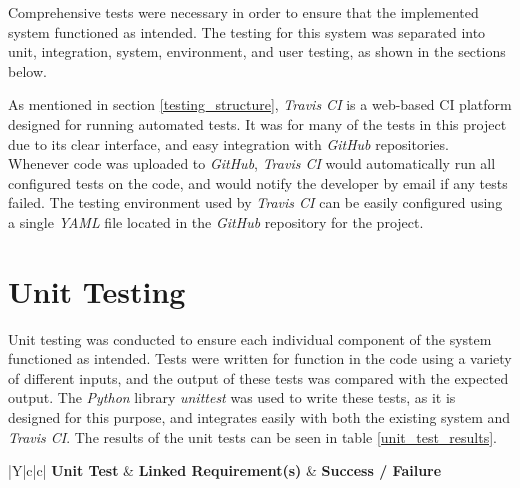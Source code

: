 %
%

Comprehensive tests were necessary in order to ensure that the implemented system functioned as intended.
The testing for this system was separated into unit, integration, system, environment, and user testing, as shown in the sections below.

As mentioned in section \ref{testing_structure}, \textit{Travis CI} \cite{travis_ci} is a web-based CI platform designed for running automated tests.
It was for many of the tests in this project due to its clear interface, and easy integration with \textit{GitHub} repositories.
Whenever code was uploaded to \textit{GitHub}, \textit{Travis CI} would automatically run all configured tests on the code, and would notify the developer by email if any tests failed.
The testing environment used by \textit{Travis CI} can be easily configured using a single \textit{YAML} \cite{yaml} file located in the \textit{GitHub} repository for the project.



\section{Unit Testing}
\label{unit_testing}
Unit testing was conducted to ensure each individual component of the system functioned as intended.
Tests were written for function in the code using a variety of different inputs, and the output of these tests was compared with the expected output.
The \textit{Python} library \textit{unittest} \cite{python_unittests} was used to write these tests, as it is designed for this purpose, and integrates easily with both the existing system and \textit{Travis CI}.
The results of the unit tests can be seen in table \ref{unit_test_results}.

\begin{table}[t]
  \caption{Results of Unit Tests}
  \begin{center}
    \begin{tabularx}{\textwidth}{|Y|c|c|} \hline
      \textbf{Unit Test} & \textbf{Linked Requirement(s)} & \textbf{Success / Failure} \\ \thickhline

    \end{tabularx}
  \end{center}
  \label{unit_test_results}
\end{table}

